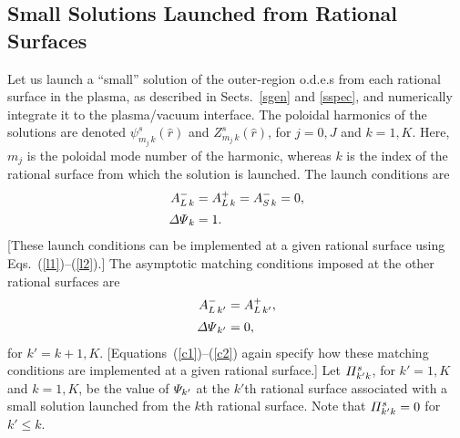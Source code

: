 \documentclass[12pt,prb,aps]{revtex4-1}
\begin{document}
\subsection{Small Solutions Launched from Rational Surfaces}\label{smalll}
Let us launch a ``small'' solution of the outer-region o.d.e.s  from each rational surface in the plasma, as described in Sects.~\ref{sgen} and \ref{sspec}, 
 and numerically integrate it to the plasma/vacuum interface. The poloidal harmonics of
the solutions are denoted $\psi^s_{m_{j}\,k}(\hat{r})$ and $Z^s_{m_{j}\,k}(\hat{r})$, for $j=0,J$ and $k=1,K$. Here,
$m_{j}$ is the poloidal mode number of the harmonic, whereas $k$ is the index of the rational surface from which the solution is launched.
The launch conditions are
\begin{align}
A_{L\,k}^- &= A_{L\,k}^+ = A_{S\,k}^- = 0,\\[0.5ex]
{\mit\Delta\Psi}_k &=1.
\end{align}
[These launch conditions can be implemented at a given rational surface using Eqs.~(\ref{l1})--(\ref{l2}).]
The asymptotic matching conditions imposed at the other rational surfaces are
\begin{align}
A_{L\,k'}^{-} &= A_{L\,k'}^+,\\[0.5ex]
{\mit\Delta\Psi}_{k'} &= 0,
\end{align}
for $k'=k+1,K$. [Equations~(\ref{c1})--(\ref{c2}) again specify how these matching conditions are implemented at a given rational surface.]
Let 
${\mit\Pi}_{k'k}^s$, for $k'=1,K$ and $k=1,K$,  be the value of ${\mit\Psi}_{k'}$ at the $k'$th rational surface associated with a small solution
launched from the $k$th rational surface. Note that ${\mit\Pi}_{k'k}^s=0$ for $k' \leq k$.  
\end{document}
